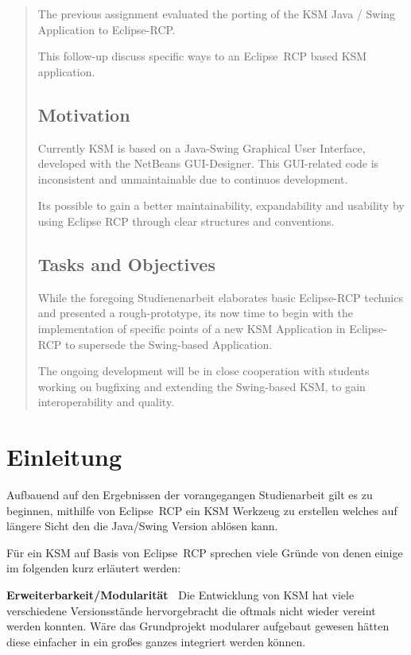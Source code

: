 \documentclass[%
12pt,titlepage,abstracton]{scrreprt}
\begin{document}
\renewcommand{\abstractname}{Summary}
\begin{abstract}
The previous assignment evaluated the porting of the KSM Java / Swing
Application to Eclipse-RCP.

This follow-up discuss specific ways  to an Eclipse~RCP based KSM application.

\section*{Motivation} Currently KSM is based on a Java-Swing Graphical User
Interface, developed with the NetBeans GUI-Designer. This GUI-related code is
inconsistent and unmaintainable due to continuos development.

Its possible to gain a better maintainability, expandability and usability by
using Eclipse RCP through clear structures and conventions.

\section*{Tasks and Objectives}
While the foregoing Studienenarbeit elaborates
basic Eclipse-RCP technics and presented a rough-prototype, its now time to
begin with the implementation of specific points of a new KSM Application in
Eclipse-RCP to supersede the Swing-based Application.

The ongoing development will be in close cooperation with students working on
bugfixing and extending the Swing-based KSM, to gain interoperability and quality.
\end{abstract}

\tableofcontents
\newpage{}

\chapter{Einleitung}
Aufbauend auf den Ergebnissen der vorangegangen Studienarbeit gilt es zu
beginnen, mithilfe von Eclipse~RCP ein KSM Werkzeug zu erstellen welches auf
längere Sicht den die Java/Swing Version ablösen kann.

Für ein KSM auf Basis von Eclipse~RCP sprechen viele Gründe von denen einige
im folgenden kurz erläutert werden:

\textbf{Erweiterbarkeit/Modularität\ } Die Entwicklung von KSM hat viele
verschiedene Versionsstände hervorgebracht die oftmals nicht wieder vereint
werden konnten. Wäre das Grundprojekt modularer aufgebaut gewesen hätten diese
einfacher in ein großes ganzes integriert werden können.
\end{document}
